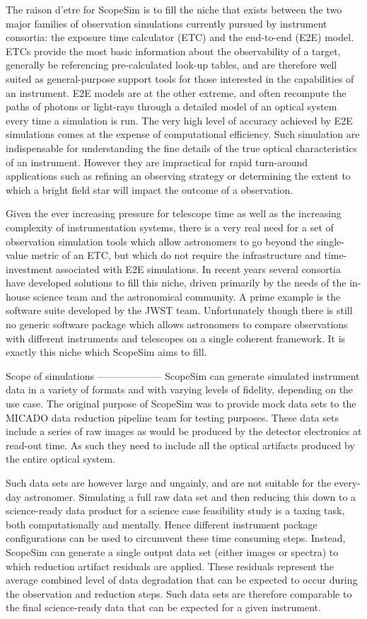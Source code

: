 The raison d'etre for ScopeSim is to fill the niche that exists between the
two major families of observation simulations currently pursued by instrument
consortia: the exposure time calculator (ETC) and the end-to-end (E2E) model.
ETCs provide the most basic information about the observability of a target,
generally be referencing pre-calculated look-up tables, and are therefore
well suited as general-purpose support tools for those interested in the
capabilities of an instrument. E2E models are at the other extreme, and
often recompute the paths of photons or light-rays through a detailed model
of an optical system every time a simulation is run. The very high level of
accuracy achieved by E2E simulations comes at the expense of computational
efficiency. Such simulation are indispensable for understanding the fine
details of the true optical characteristics of an instrument. However they are
impractical for rapid turn-around applications such as refining an
observing strategy or determining the extent to which a bright field star
will impact the outcome of a observation.

Given the ever increasing pressure for telescope time as well as the
increasing complexity of instrumentation systems, there is a very real need
for a set of observation simulation tools which allow astronomers to go
beyond the single-value metric of an ETC, but which do not require the
infrastructure and time-investment associated with E2E simulations. In recent
years several consortia have developed solutions to fill this niche, driven
primarily by the needs of the in-house science team and the astronomical
community. A prime example is the software suite developed by the JWST team.
Unfortunately though there is still no generic software
package which allows astronomers to compare observations with different
instruments and telescopes on a single coherent framework. It is exactly this
niche which ScopeSim aims to fill.


Scope of simulations
--------------------
ScopeSim can generate simulated instrument data in a variety of formats and
with varying levels of fidelity, depending on the use case. The original purpose
of ScopeSim was to provide mock data sets to the MICADO data reduction pipeline
team for testing purposes. These data sets include a series of raw images as
would be produced by the detector electronics at read-out time. As such they
need to include all the optical artifacts produced by the entire optical system.

Such data sets are however large and ungainly, and are not suitable for the
every-day astronomer. Simulating a full raw data set and then reducing this
down to a science-ready data product for a science case feasibility study is
a taxing task, both computationally and mentally. Hence different instrument
package configurations can be used to circumvent these time consuming steps.
Instead, ScopeSim can generate a single output data set (either images or
spectra) to which reduction artifact residuals are applied. These residuals
represent the average combined level of data degradation that can be expected to
occur during the observation and reduction steps. Such data sets are therefore
comparable to the final science-ready data that can be expected for a given
instrument.

